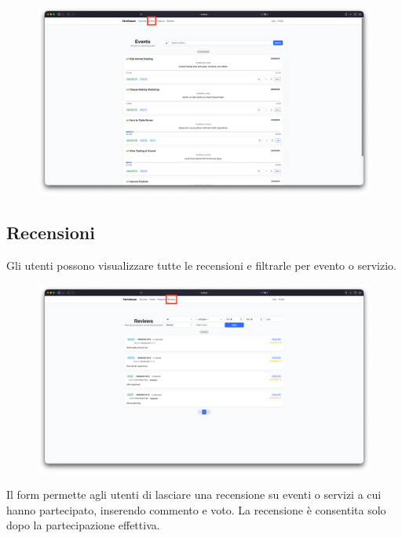 \documentclass[a4paper,12pt]{report}
\begin{document}
\begin{figure}[H]
    \centering
    \includegraphics[width=\textwidth, trim=0 0 0 0]{./img/users/events.png}
    \vspace{-1em}
    \label{fig:events}
\end{figure}

\subsection*{Recensioni}
Gli utenti possono visualizzare tutte le recensioni e filtrarle per evento o servizio.

\begin{figure}[H]
    \centering
    \includegraphics[width=\textwidth, trim=0 0 0 0]{./img/users/reviews.png}
    \vspace{-1em}
    \label{fig:recensione}
\end{figure}

Il form permette agli utenti di lasciare una recensione su eventi o servizi a cui hanno partecipato, 
inserendo commento e voto. La recensione è consentita solo dopo la partecipazione effettiva.
\end{document}
